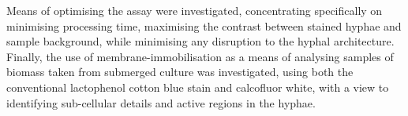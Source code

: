 Means of optimising the assay were investigated, concentrating specifically on minimising processing time, maximising the contrast between stained hyphae and sample background, while minimising any disruption to the hyphal architecture. Finally, the use of membrane-immobilisation as a means of analysing samples of biomass taken from submerged culture was investigated, using both the conventional lactophenol cotton blue stain and calcofluor white, with a view to identifying sub-cellular details and active regions in the hyphae.
